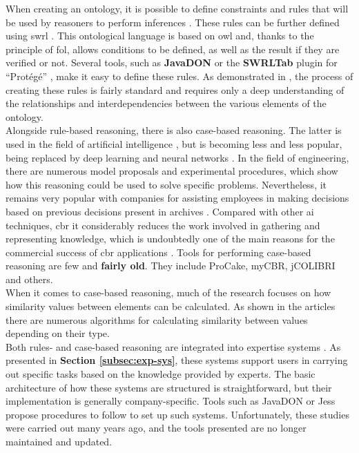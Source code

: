             When creating an ontology, it is possible to define constraints and rules that will be used by reasoners to perform inferences \cite{noy2001ontology}. These rules can be further defined using \acrfull{swrl} \cite{liu2010ontology, abadi2018improving}. This ontological language is based on \acrshort{owl} and, thanks to the principle of \acrfull{fol}, allows conditions to be defined, as well as the result if they are verified or not. Several tools, such as \textbf{JavaDON} \cite{jovanovic2005achieving} or the \textbf{SWRLTab} plugin for “Protégé” \cite{liu2010ontology}, make it easy to define these rules. As demonstrated in \cite{li2018ontology, jeon2016automatic, na2016development}, the process of creating these rules is fairly standard and requires only a deep understanding of the relationships and interdependencies between the various elements of the ontology.\\

            Alongside rule-based reasoning, there is also case-based reasoning. The latter is used in the field of artificial intelligence \cite{wilke1995fallbasiertes, althoff1992fallbasiertes}, but is becoming less and less popular, being replaced by deep learning and neural networks \cite{wiratunga2011case}. In the field of engineering, there are numerous model proposals and experimental procedures, which show how this reasoning could be used to solve specific problems. Nevertheless, it remains very popular with companies for assisting employees in making decisions based on previous decisions present in archives \cite{eshach2003case}. Compared with other \acrshort{ai} techniques, \acrshort{cbr} it considerably reduces the work involved in gathering and representing knowledge, which is undoubtedly one of the main reasons for the commercial success of \acrshort{cbr} applications \cite{benjamin2006using, wiratunga2011case}. Tools for performing case-based reasoning are few and \textbf{fairly old}. They include ProCake, myCBR, jCOLIBRI and others.\\

            When it comes to case-based reasoning, much of the research focuses on how similarity values between elements can be calculated. As shown in the articles \cite{shaheen2020novel, chen2012recommendation, wang2020similarity, malburg2021improving, racharak2021approximation, adel2022interval} there are numerous algorithms for calculating similarity between values depending on their type.\\

            Both rules- and case-based reasoning are integrated into expertise systems \cite{lin2021multivariable}. As presented in \textbf{Section \ref{subsec:exp-sys}}, these systems support users in carrying out specific tasks based on the knowledge provided by experts. The basic architecture of how these systems are structured is straightforward, but their implementation is generally company-specific. Tools such as JavaDON or Jess propose procedures to follow to set up such systems. Unfortunately, these studies were carried out many years ago, and the tools presented are no longer maintained and updated.\\

